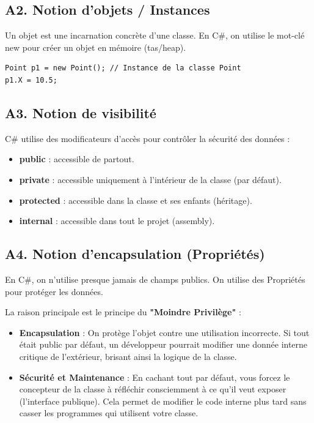 \subsection*{A2. Notion d'objets / Instances}
{}
\noindent Un objet est une incarnation concrète d'une classe. En C\#, on utilise le mot-clé new pour créer un objet en mémoire (tas/heap).

\vspace{0.5cm}

\begin{verbatim}
Point p1 = new Point(); // Instance de la classe Point
p1.X = 10.5;
\end{verbatim}

\subsection*{A3. Notion de visibilité}
{}
\noindent C\# utilise des modificateurs d'accès pour contrôler la sécurité des données :

\begin{itemize}
	\item \textbf{public} : accessible de partout.
	\item \textbf{private} : accessible uniquement à l'intérieur de la classe (par défaut).
	\item \textbf{protected} : accessible dans la classe et ses enfants (héritage).
	\item \textbf{internal} : accessible dans tout le projet (assembly).
\end{itemize}

\newpage

\subsection*{A4. Notion d'encapsulation (Propriétés)}
{}
\noindent En C\#, on n'utilise presque jamais de champs publics. On utilise des Propriétés pour protéger les données.

\vspace{0.5cm}

\noindent La raison principale est le principe du \textbf{"Moindre Privilège"} :
\begin{itemize}
	\item \textbf{Encapsulation} : On protège l'objet contre une utilisation incorrecte. Si tout était public par défaut, un développeur pourrait modifier une donnée interne critique de l'extérieur, brisant ainsi la logique de la classe.
	\item \textbf{Sécurité et Maintenance} : En cachant tout par défaut, vous forcez le concepteur de la classe à réfléchir consciemment à ce qu'il veut exposer (l'interface publique). Cela permet de modifier le code interne plus tard sans casser les programmes qui utilisent votre classe.
\end{itemize}
    
